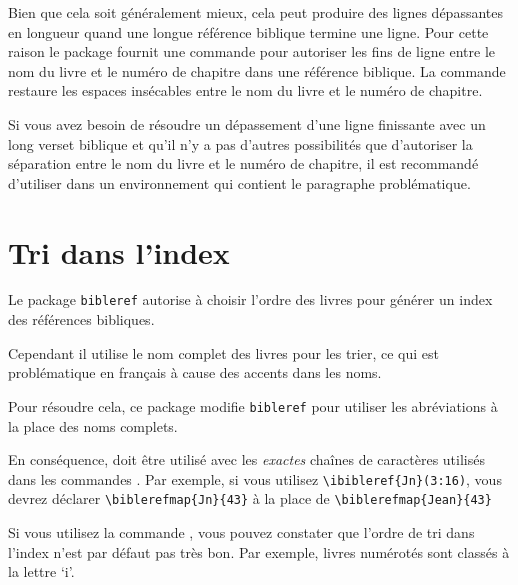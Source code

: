 \documentclass{ltxdoc}
\begin{document}
Bien que cela soit généralement mieux, cela peut produire des lignes dépassantes en longueur quand une longue référence biblique termine une ligne.
Pour cette raison le package fournit une commande  pour autoriser les fins de ligne entre le nom du livre et le numéro de chapitre dans une référence biblique.
La commande  restaure les espaces insécables entre le nom du livre et le numéro de chapitre.

Si vous avez besoin de résoudre un dépassement d'une ligne finissante avec un long verset biblique et qu'il n'y a pas d'autres possibilités que d'autoriser la séparation entre le nom du livre et le numéro de chapitre, il est recommandé d'utiliser  dans un environnement qui contient le paragraphe problématique.

\section{Tri dans l'index}
Le package \verb|bibleref| autorise à choisir l'ordre des livres pour générer un index des références bibliques.

Cependant il utilise le nom complet des livres pour les trier, ce qui est problématique en français à cause des accents dans les noms.

Pour résoudre cela, ce package modifie \verb|bibleref| pour utiliser les abréviations à la place des noms complets.

En conséquence,  doit être utilisé avec les \emph{exactes} chaînes de caractères utilisés dans les commandes . Par exemple, si vous utilisez \verb|\ibibleref{Jn}(3:16)|, vous devrez déclarer \verb|\biblerefmap{Jn}{43}| à la place de \verb|\biblerefmap{Jean}{43}|


 Si vous utilisez la commande , vous pouvez constater que l'ordre de tri dans l'index n'est par défaut pas très bon. Par exemple, livres numérotés sont classés à la lettre `i'.
\end{document}
